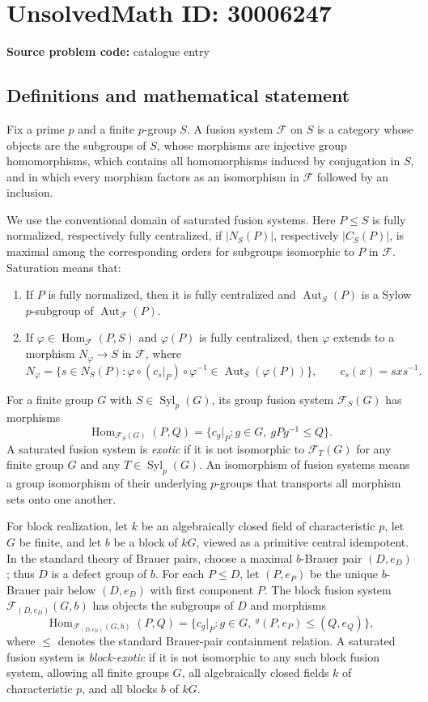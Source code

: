 \documentclass[11pt]{article}
\begin{document}
\section*{UnsolvedMath ID: 30006247}
\textbf{Source problem code:} catalogue entry
\subsection{Definitions and mathematical statement}
Fix a prime \(p\) and a finite \(p\)-group \(S\). A fusion system \(\mathcal F\) on \(S\) is a category whose objects are the subgroups of \(S\), whose morphisms are injective group homomorphisms, which contains all homomorphisms induced by conjugation in \(S\), and in which every morphism factors as an isomorphism in \(\mathcal F\) followed by an inclusion.

We use the conventional domain of saturated fusion systems. Here \(P\leq S\) is fully normalized, respectively fully centralized, if \(|N_S(P)|\), respectively \(|C_S(P)|\), is maximal among the corresponding orders for subgroups isomorphic to \(P\) in \(\mathcal F\). Saturation means that:
\begin{enumerate}
\item If \(P\) is fully normalized, then it is fully centralized and \(\operatorname{Aut}_S(P)\) is a Sylow \(p\)-subgroup of \(\operatorname{Aut}_{\mathcal F}(P)\).
\item If \(\varphi\in\operatorname{Hom}_{\mathcal F}(P,S)\) and \(\varphi(P)\) is fully centralized, then \(\varphi\) extends to a morphism \(N_\varphi\to S\) in \(\mathcal F\), where
\[
N_\varphi=\{s\in N_S(P):\varphi\circ(c_s|_P)\circ\varphi^{-1}\in\operatorname{Aut}_S(\varphi(P))\},
\qquad c_s(x)=sxs^{-1}.
\]
\end{enumerate}

For a finite group \(G\) with \(S\in\operatorname{Syl}_p(G)\), its group fusion system \(\mathcal F_S(G)\) has morphisms
\[
\operatorname{Hom}_{\mathcal F_S(G)}(P,Q)
=\{c_g|_P:g\in G,\ gPg^{-1}\leq Q\}.
\]
A saturated fusion system is \emph{exotic} if it is not isomorphic to \(\mathcal F_T(G)\) for any finite group \(G\) and any \(T\in\operatorname{Syl}_p(G)\). An isomorphism of fusion systems means a group isomorphism of their underlying \(p\)-groups that transports all morphism sets onto one another.

For block realization, let \(k\) be an algebraically closed field of characteristic \(p\), let \(G\) be finite, and let \(b\) be a block of \(kG\), viewed as a primitive central idempotent. In the standard theory of Brauer pairs, choose a maximal \(b\)-Brauer pair \((D,e_D)\); thus \(D\) is a defect group of \(b\). For each \(P\leq D\), let \((P,e_P)\) be the unique \(b\)-Brauer pair below \((D,e_D)\) with first component \(P\). The block fusion system \(\mathcal F_{(D,e_D)}(G,b)\) has objects the subgroups of \(D\) and morphisms
\[
\operatorname{Hom}_{\mathcal F_{(D,e_D)}(G,b)}(P,Q)
=\{c_g|_P:g\in G,\ {}^g(P,e_P)\leq(Q,e_Q)\},
\]
where \(\leq\) denotes the standard Brauer-pair containment relation. A saturated fusion system is \emph{block-exotic} if it is not isomorphic to any such block fusion system, allowing all finite groups \(G\), all algebraically closed fields \(k\) of characteristic \(p\), and all blocks \(b\) of \(kG\).
\end{document}
